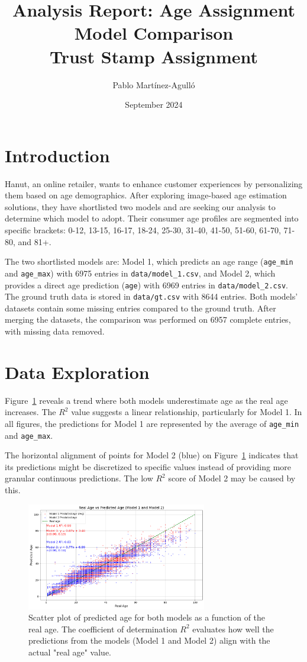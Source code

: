 \documentclass[10pt]{article}
\title{Analysis Report: Age Assignment Model Comparison \\ Trust Stamp Assignment}
\author{Pablo Martínez-Agulló}
\date{September 2024}
\begin{document}
\maketitle

\section{Introduction}
Hanut, an online retailer, wants to enhance customer experiences by personalizing them based on age demographics. After exploring image-based age estimation solutions, they have shortlisted two models and are seeking our analysis to determine which model to adopt. Their consumer age profiles are segmented into specific brackets: 0-12, 13-15, 16-17, 18-24, 25-30, 31-40, 41-50, 51-60, 61-70, 71-80, and 81+.

The two shortlisted models are: Model 1, which predicts an age range (\texttt{age\_min} and \texttt{age\_max}) with 6975 entries in \texttt{data/model\_1.csv}, and Model 2, which provides a direct age prediction (\texttt{age}) with 6969 entries in \texttt{data/model\_2.csv}. The ground truth data is stored in \texttt{data/gt.csv} with 8644 entries. Both models' datasets contain some missing entries compared to the ground truth. After merging the datasets, the comparison was performed on 6957 complete entries, with missing data removed.

\section{Data Exploration}
Figure~\ref{fig:Scatter} reveals a trend where both models underestimate age as the real age increases. The $R^2$ value suggests a linear relationship, particularly for Model 1. In all figures, the predictions for Model 1 are represented by the average of \texttt{age\_min} and \texttt{age\_max}. 

The horizontal alignment of points for Model 2 (blue) on Figure~\ref{fig:Scatter} indicates that its predictions might be discretized to specific values instead of providing more granular continuous predictions. The low $R^2$ score of Model 2 may be caused by this.


\begin{figure}[h]
    \centering
    \includegraphics[width=0.7\textwidth]{images/0_Scatter_Real_vs_prediction_Final.png}
    \caption{Scatter plot of predicted age for both models as a function of the real age. The coefficient of determination $R^2$ evaluates how well the predictions from the models (Model 1 and Model 2) align with the actual "real age" value.}
    \label{fig:Scatter}
\end{figure}
\end{document}
